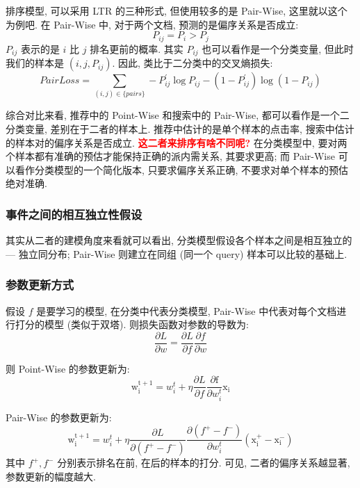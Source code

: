 排序模型, 可以采用 LTR 的三种形式, 但使用较多的是 Pair-Wise, 这里就以这个为例吧. 在 Pair-Wise 中, 对于两个文档, 预测的是偏序关系是否成立:
$$
P_{i j} = P_{i} > P_{j}
$$
$P_{ij}$ 表示的是 $i$ 比 $j$ 排名更前的概率. 其实 $P_{ij}$ 也可以看作是一个分类变量, 但此时我们的样本是 $(i, j, P_{ij})$. 因此, 类比于二分类中的交叉熵损失:
$$
PairLoss = \sum_{(i, j) \in \{pairs\}} -P^\prime_{ij} \log P_{ij} - (1 - P^\prime_{ij}) \log (1 - P_{ij})
$$

综合对比来看, 推荐中的 Point-Wise 和搜索中的 Pair-Wise, 都可以看作是一个二分类变量, 差别在于二者的样本上. 推荐中估计的是单个样本的点击率, 搜索中估计的样本对的偏序关系是否成立. \textbf{\textcolor{red}{这二者来排序有啥不同呢?}} 在分类模型中, 要对两个样本都有准确的预估才能保持正确的派内需关系, 其要求更高; 而 Pair-Wise 可以看作分类模型的一个简化版本, 只要求偏序关系正确, 不要求对单个样本的预估绝对准确.

\subsubsection{事件之间的相互独立性假设} 
其实从二者的建模角度来看就可以看出, 分类模型假设各个样本之间是相互独立的 --- 独立同分布; Pair-Wise 则建立在同组 (同一个 query) 样本可以比较的基础上. 

\subsubsection{参数更新方式}
假设 $f$ 是要学习的模型, 在分类中代表分类模型, Pair-Wise 中代表对每个文档进行打分的模型 (类似于双塔). 则损失函数对参数的导数为:
$$
\frac{\partial L}{\partial w}=\frac{\partial L}{\partial f} \frac{\partial f}{\partial w}
$$

则 Point-Wise 的参数更新为:
$$
\mathrm{w}_{\mathrm{i}}^{\mathrm{t}+1}=w_{i}^{t}+\eta \frac{\partial L}{\partial f} \frac{\partial \mathrm{f}}{\partial w_{i}^{t}} \mathrm{x}_{\mathrm{i}}
$$

Pair-Wise 的参数更新为:
$$
\mathrm{w}_{\mathrm{i}}^{\mathrm{t}+1}=w_{i}^{t}+\eta \frac{\partial L}{\partial\left(f^{+}-f^{-}\right)} \frac{\partial\left(f^{+}-f^{-}\right)}{\partial w_{i}^{t}}\left(\mathrm{x}_{\mathrm{i}}^{+}-\mathrm{x}_{\mathrm{i}}^{-}\right)
$$
其中 $f^+, f^-$ 分别表示排名在前, 在后的样本的打分. 可见, 二者的偏序关系越显著, 参数更新的幅度越大.
